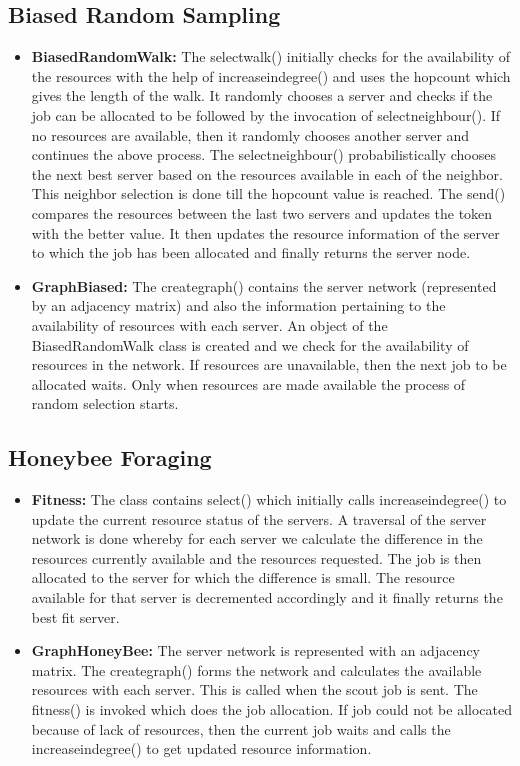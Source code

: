 \subsection{Biased Random Sampling}
\begin{itemize}
\item \textbf{BiasedRandomWalk:} The selectwalk() initially checks for the availability of the resources with the help of increaseindegree() and uses the hopcount which gives the length of the walk. It randomly chooses a server and checks if the job can be allocated to be followed by the invocation of selectneighbour(). If no resources are available, then it randomly chooses another server and continues the above process. The selectneighbour() probabilistically chooses the next best server based on the resources available in each of the neighbor. This neighbor selection is done till the hopcount value is reached. The send() compares the resources between the last two servers and updates the token with the better value. It then updates the resource information of the server to which the job has been allocated and finally returns the server node.
\item \textbf{GraphBiased:} The creategraph() contains the server network (represented by an adjacency matrix) and also the information pertaining to the availability of resources with each server. An object of the BiasedRandomWalk class is created and we check for the availability of resources in the network. If resources are unavailable, then the next job to be allocated waits. Only when resources are made available the process of random selection starts.
\end{itemize}

\subsection{Honeybee Foraging}
\begin{itemize}
\item \textbf{Fitness:} The class contains select() which initially calls increaseindegree() to update the current resource status of the servers. A traversal of the server network is done whereby for each server we calculate the difference in the resources currently available and the resources requested. The job is then allocated to the server for which the difference is small. The resource available for that server is decremented accordingly and it finally returns the best fit server.
\item \textbf{GraphHoneyBee:} The server network is represented with an adjacency matrix. The creategraph() forms the network and calculates the available resources with each server. This is called when the scout job is sent. The fitness() is invoked which does the job allocation. If job could not be allocated because of lack of resources, then the current job waits and calls the increaseindegree() to get updated resource information.
\end{itemize}

